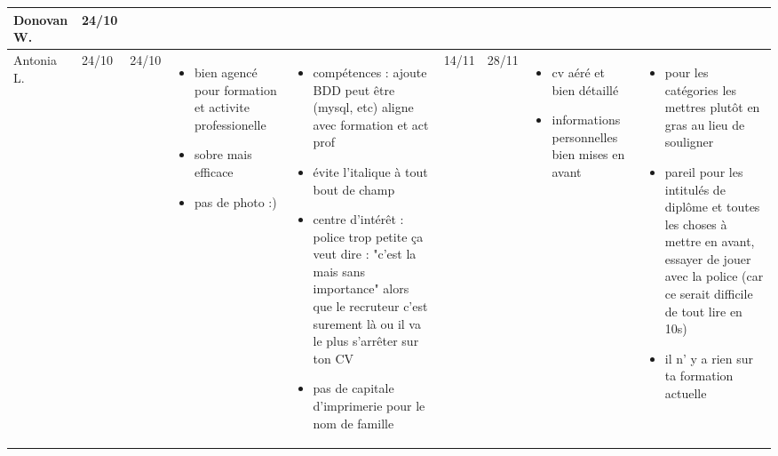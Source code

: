 \documentclass[a4paper,11pt]{article}
\begin{document}
\begin{landscape}
\begin{longtable}{|l|l|l|p{4cm}|p{4cm}|l|l|p{4cm}|p{4cm}|}
    Donovan W. & 24/10 & & & & & & & \\ \hline

    Antonia L. 	& 24/10 & 24/10
		& \begin{itemize}
		  \item bien agencé pour formation et activite professionelle
		  \item sobre mais efficace
		  \item pas de photo :)
		  \end{itemize}
		& \begin{itemize}
		  \item compétences : ajoute BDD peut être (mysql, etc) aligne avec formation et act prof
		  \item évite l'italique à tout bout de champ
		  \item centre d'intérêt : police trop petite ça veut dire  : "c'est la mais sans importance" alors que le recruteur c'est surement là ou il va le plus s’arrêter sur ton CV
		  \item pas de capitale d'imprimerie pour le nom de famille
		  \end{itemize}
		& 14/11 & 28/11
		& \begin{itemize}
		  \item cv aéré et bien détaillé
		  \item informations personnelles bien mises en avant
		  \end{itemize}
		& \begin{itemize}
		  \item pour les catégories les mettres plutôt en gras au lieu de souligner
		  \item pareil pour les intitulés de diplôme et toutes les choses à mettre en avant, essayer de jouer avec la police (car ce serait difficile de tout lire en 10s)
		  \item il n' y a rien sur ta formation actuelle
		  \end{itemize} \\ \hline


\end{longtable}
\end{landscape}
\end{document}
